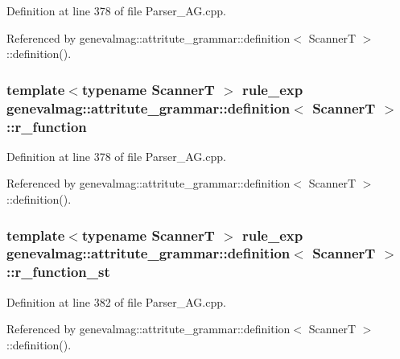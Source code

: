 Definition at line 378 of file Parser\_\-AG.cpp.



Referenced by genevalmag::attritute\_\-grammar::definition$<$ ScannerT $>$::definition().

\hypertarget{structgenevalmag_1_1attritute__grammar_1_1definition_a8a68eb853e2fa23baaac61a0087074be}{
\subsubsection[{r\_\-function}]{\setlength{\rightskip}{0pt plus 5cm}template$<$typename ScannerT $>$ {\bf rule\_\-exp} {\bf genevalmag::attritute\_\-grammar::definition}$<$ ScannerT $>$::{\bf r\_\-function}}}
\label{structgenevalmag_1_1attritute__grammar_1_1definition_a8a68eb853e2fa23baaac61a0087074be}


Definition at line 378 of file Parser\_\-AG.cpp.



Referenced by genevalmag::attritute\_\-grammar::definition$<$ ScannerT $>$::definition().

\hypertarget{structgenevalmag_1_1attritute__grammar_1_1definition_a8efa4b64c8fa11f71c1d37cb8036a469}{
\subsubsection[{r\_\-function\_\-st}]{\setlength{\rightskip}{0pt plus 5cm}template$<$typename ScannerT $>$ {\bf rule\_\-exp} {\bf genevalmag::attritute\_\-grammar::definition}$<$ ScannerT $>$::{\bf r\_\-function\_\-st}}}
\label{structgenevalmag_1_1attritute__grammar_1_1definition_a8efa4b64c8fa11f71c1d37cb8036a469}


Definition at line 382 of file Parser\_\-AG.cpp.



Referenced by genevalmag::attritute\_\-grammar::definition$<$ ScannerT $>$::definition().

